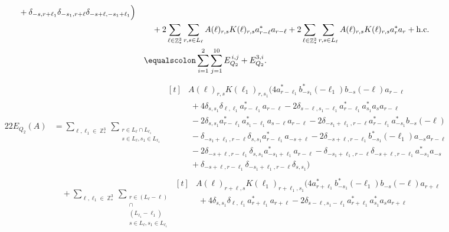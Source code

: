 \documentclass[sn-mathphys, Numbered ,a4paper]{sn-jnl}%
\DeclareMathOperator{\Z}{\mathbb{Z}}
\theoremstyle{plain}
\theoremstyle{definition}
\theoremstyle{remark}
\theoremstyle{plain}
\theoremstyle{definition}
\theoremstyle{remark}
\begin{document}
{\begin{alignat}{2}
\begin{aligned}[t]
		&\;+\delta_{-s,r+\ell_1} \delta_{-s_1,r+\ell} \delta_{-s+\ell,-s_1+\ell_1} \Big)  
	\end{aligned}\\
	&\quad+2\sum\limits_{\ell \in \Z^3_*}\sum\limits_{r,s \in L_{\ell}} A(\ell)_{r,s}K(\ell)_{r,s}a^*_{r-\ell}a_{r-\ell} +2\sum\limits_{\ell \in \Z^3_*}\sum\limits_{r,s \in L_{\ell}} A(\ell)_{r,s}K(\ell)_{r,s} a^*_{r} a_{r} +\mathrm{h.c.}\nonumber\\
	&\equalscolon \sum\limits_{i=1}^{2}\sum\limits_{j=1}^{10} E_{Q_2}^{\,i,j}\nonumber + E_{Q_2}^{3,i}.
\end{alignat}
\begin{alignat}{2}
	2E_{Q_2}(A) &=
	\!\!\!\sum\limits_{\ell,\ell_1 \in \Z^3_*}\sum\limits_{\substack{r\in L_{\ell} \cap L_{\ell_1}\\ s \in L_{\ell},s_1\in L_{\ell_1}}} \!\!\!\begin{aligned}[t] &A(\ell)_{r,s}K(\ell_1)_{r,s_1}\Big( 4a^*_{r-\ell_1}b^*_{-s_1}(-\ell_1)b_{-s}(-\ell)a_{r-\ell} \nonumber\\ 
		&\;+ 4\delta_{s,s_1} \delta_{\ell,\ell_1 } a^*_{r-\ell_1} a_{r-\ell} -2\delta_{s-\ell,s_1-\ell_1}a^*_{r-\ell_1} a^*_{s_1} a_{s} a_{r-\ell} \nonumber\\
		&\;-2\delta_{s,s_1}a^*_{r-\ell_1} a^*_{s_1-\ell_1}a_{s-\ell} a_{r-\ell} - 2\delta_{-s_1+\ell_1,r-\ell} a^*_{r-\ell_1} a^*_{-s_1} b_{-s}(-\ell)\nonumber\\
		&\;-\delta_{-s_1+\ell_1,r-\ell}\delta_{s,s_1}a^*_{r-\ell_1}a_{-s+\ell} - 2\delta_{-s+\ell,r-\ell_1}b^*_{-s_1}(-\ell_1)a_{-s}a_{r-\ell} \nonumber\\
		&\;-2\delta_{-s+\ell,r-\ell_1}\delta_{s,s_1}a^*_{-s_1+\ell_1} a_{r-\ell} - \delta_{-s_1+\ell_1,r-\ell}\delta_{-s+\ell,r-\ell_1}a^*_{-s_1}a_{-s} \nonumber\\
		&\;+\delta_{-s+\ell,r-\ell_1}\delta_{-s_1+\ell_1,r-\ell}\delta_{s,s_1}  \Big)    
	\end{aligned}\\
	&\quad +\!\!\!\sum\limits_{\ell,\ell_1 \in \Z^3_*}\sum\limits_{\substack{r\in (L_{\ell}-\ell)\\ \cap \\(L_{\ell_1}-\ell_1)\\ s \in L_{\ell},s_1\in L_{\ell_1}}}\!\!\!\!\!\begin{aligned}[t] &A(\ell)_{r+\ell,s}K(\ell_1)_{r+\ell_1,s_1}\Big(4a^*_{r+\ell_1}b^*_{-s_1}(-\ell_1)b_{-s}(-\ell)a_{r+\ell} \nonumber\\
		&\;+ 4\delta_{s,s_1} \delta_{\ell,\ell_1 } a^*_{r+\ell_1} a_{r+\ell} -2\delta_{s-\ell,s_1-\ell_1}a^*_{r+\ell_1} a^*_{s_1} a_{s} a_{r+\ell} \nonumber\\

\end{aligned}
\end{alignat}}
\end{document}
